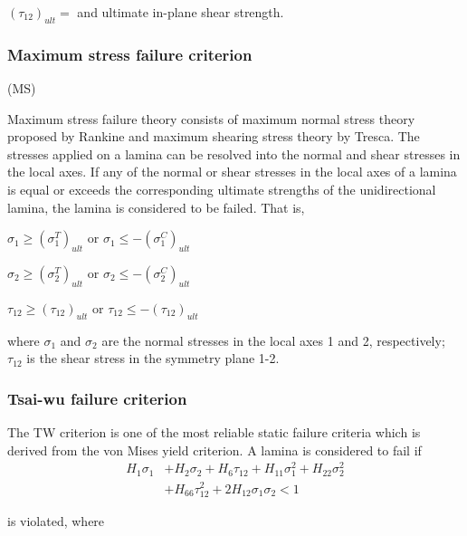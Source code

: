 $(\tau_{12})_{ult}= $ and ultimate in-plane shear strength.



\subsubsection{Maximum stress failure criterion}(MS)


Maximum stress failure theory consists of maximum normal stress theory proposed by Rankine and maximum 
shearing stress theory by Tresca. The stresses applied on a lamina can be resolved into the normal and shear stresses 
in the local axes. If any of the normal or shear stresses in the local axes of a lamina is equal or exceeds the corresponding 
ultimate strengths of the unidirectional lamina, the lamina is considered to be failed. That is,

$\sigma_1 \geq (\sigma _1^{T})_{ult} $ or $\sigma_1 \leq -(\sigma _1^{C})_{ult} $

$\sigma_2 \geq (\sigma _2^{T})_{ult} $ or $\sigma_2 \leq -(\sigma _2^{C})_{ult} $

$\tau_{12} \geq (\tau_{12})_{ult} $  or $\tau_{12} \leq -(\tau_{12})_{ult} $

where $\sigma_1$ and $\sigma_2$ are the normal stresses in the local axes 1 and 2, respectively;
$\tau_{12}$ is the shear stress in the symmetry plane 1-2.

\subsubsection{Tsai-wu failure criterion}
The TW criterion is one of the most reliable static failure criteria which is derived from the von
Mises yield criterion.  
A lamina is considered to fail
if \begin{equation} \label{eq:tsai_wu}
\begin{split}
	H_1 \sigma_1  & + H_2 \sigma_2 + H_6 \tau_{12} + H_{11}\sigma_1^2 + H_{22} \sigma_2^2 \\
				  & + H_{66}  \tau_{12}^2 + 2H_{12}\sigma_1\sigma_2 < 1
\end{split}
\end{equation}

is violated, where

